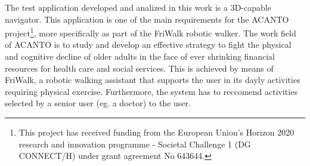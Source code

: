 The test application developed and analized in this work is a 3D-capable navigator.
This application is one of the main requirements for the ACANTO~\cite{acanto}
project\footnote{This project has received funding from the European Union’s Horizon
2020 research and innovation programme - Societal Challenge 1 (DG CONNECT/H) under 
grant agreement No 643644.}, more specifically as part of the FriWalk robotic walker.
The work field of ACANTO is to study and develop an effective strategy to fight the
physical and cognitive decline of older adults in the face of ever shrinking financial
resources for health care and social services. This is achieved by means of FriWalk,
a robotic walking assistant that supports the user in its dayly activities requiring
physical exercise. Furthermore, the system has to reccomend activities selected 
by a senior user (eg. a doctor) to the user.
